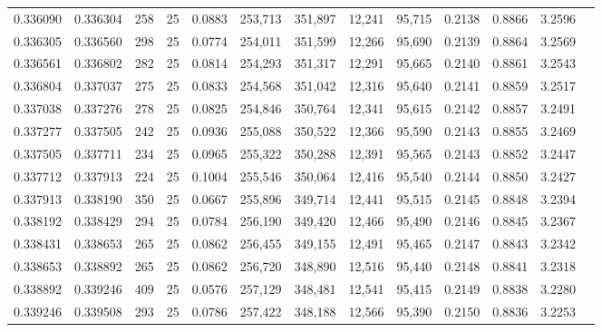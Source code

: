 \begin{tabular}{rrrrrrrrrrrrr}
0.336090 & 0.336304 &   258 &  25 &                                     0.0883 & 253,713 & 351,897 &  12,241 &  95,715 & 0.2138 & 0.8866 & 3.2596 \\
0.336305 & 0.336560 &   298 &  25 &                                     0.0774 & 254,011 & 351,599 &  12,266 &  95,690 & 0.2139 & 0.8864 & 3.2569 \\
0.336561 & 0.336802 &   282 &  25 &                                     0.0814 & 254,293 & 351,317 &  12,291 &  95,665 & 0.2140 & 0.8861 & 3.2543 \\
0.336804 & 0.337037 &   275 &  25 &                                     0.0833 & 254,568 & 351,042 &  12,316 &  95,640 & 0.2141 & 0.8859 & 3.2517 \\
0.337038 & 0.337276 &   278 &  25 &                                     0.0825 & 254,846 & 350,764 &  12,341 &  95,615 & 0.2142 & 0.8857 & 3.2491 \\
0.337277 & 0.337505 &   242 &  25 &                                     0.0936 & 255,088 & 350,522 &  12,366 &  95,590 & 0.2143 & 0.8855 & 3.2469 \\
0.337505 & 0.337711 &   234 &  25 &                                     0.0965 & 255,322 & 350,288 &  12,391 &  95,565 & 0.2143 & 0.8852 & 3.2447 \\
0.337712 & 0.337913 &   224 &  25 &                                     0.1004 & 255,546 & 350,064 &  12,416 &  95,540 & 0.2144 & 0.8850 & 3.2427 \\
0.337913 & 0.338190 &   350 &  25 &                                     0.0667 & 255,896 & 349,714 &  12,441 &  95,515 & 0.2145 & 0.8848 & 3.2394 \\
0.338192 & 0.338429 &   294 &  25 &                                     0.0784 & 256,190 & 349,420 &  12,466 &  95,490 & 0.2146 & 0.8845 & 3.2367 \\
0.338431 & 0.338653 &   265 &  25 &                                     0.0862 & 256,455 & 349,155 &  12,491 &  95,465 & 0.2147 & 0.8843 & 3.2342 \\
0.338653 & 0.338892 &   265 &  25 &                                     0.0862 & 256,720 & 348,890 &  12,516 &  95,440 & 0.2148 & 0.8841 & 3.2318 \\
0.338892 & 0.339246 &   409 &  25 &                                     0.0576 & 257,129 & 348,481 &  12,541 &  95,415 & 0.2149 & 0.8838 & 3.2280 \\
0.339246 & 0.339508 &   293 &  25 &                                     0.0786 & 257,422 & 348,188 &  12,566 &  95,390 & 0.2150 & 0.8836 & 3.2253 \\

\end{tabular}
